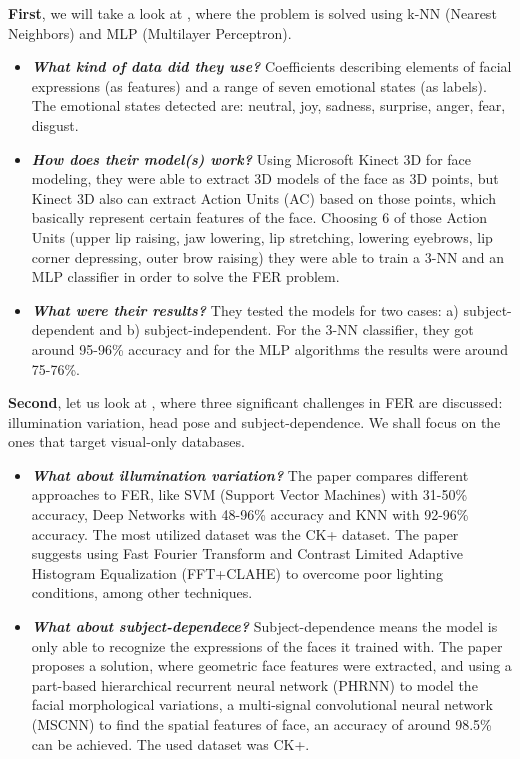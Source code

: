 \documentclass[runningheads,a4paper,11pt]{report}
\begin{document}
\textbf{First}, we will take a look at \cite{Tarnowski17}, where the problem is solved using k-NN (Nearest Neighbors) and MLP (Multilayer Perceptron).
\begin{itemize}
	\item \textbf{\emph{What kind of data did they use?}} Coefficients describing elements of facial expressions (as features) and a range of seven emotional states (as labels). The emotional states detected are: neutral, joy, sadness, surprise, anger, fear, disgust.
	\item \textbf{\emph{How does their model(s) work?}} Using Microsoft Kinect 3D for face modeling, they were able to extract 3D models of the face as 3D points, but Kinect 3D also can extract Action Units (AC) based on those points, which basically represent certain features of the face. Choosing 6 of those Action Units (upper lip raising, jaw lowering, lip stretching, lowering eyebrows, lip corner depressing, outer brow raising) they were able to train a 3-NN and an MLP classifier in order to solve the FER problem.
	\item \textbf{\emph{What were their results?}} They tested the models for two cases: a) subject-dependent and b) subject-independent. For the 3-NN classifier, they got around 95-96\% accuracy and for the MLP algorithms the results were around 75-76\%.
\end{itemize}

\textbf{Second}, let us look at \cite{Samadiani19}, where three significant challenges in FER are discussed: illumination variation, head pose and subject-dependence. We shall focus on the ones that target visual-only databases.
\begin{itemize}
	\item \textbf{\emph{What about illumination variation?}} The paper compares different approaches to FER, like SVM (Support Vector Machines) with 31-50\% accuracy, Deep Networks with 48-96\% accuracy and KNN with 92-96\% accuracy. The most utilized dataset was the CK+ dataset. The paper suggests using Fast Fourier Transform and Contrast Limited Adaptive Histogram Equalization (FFT+CLAHE) to overcome poor lighting conditions, among other techniques.
	\item \textbf{\emph{What about subject-dependece?}} Subject-dependence means the model is only able to recognize the expressions of the faces it trained with. The paper proposes a solution, where geometric face features were extracted, and using a part-based hierarchical recurrent neural network (PHRNN) to model the facial morphological variations, a multi-signal convolutional neural network (MSCNN) to find the spatial features of face, an accuracy of around 98.5\% can be achieved. The used dataset was CK+.
\end{itemize}
\end{document}
